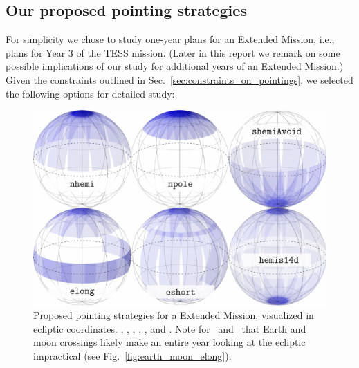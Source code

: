 \subsection{Our proposed pointing strategies}
\label{sec:proposed_pointings}

For simplicity we chose to study one-year plans for an Extended
Mission, i.e., plans for Year 3 of the TESS mission. (Later in this
report we remark on some possible implications of our study for
additional years of an Extended Mission.)  Given the constraints
outlined in Sec.~\ref{sec:constraints_on_pointings}, we selected the
following options for detailed study:

\begin{figure}[ht]
	\includegraphics{figures/proposed_pointings_texttt.pdf}
	\caption{Proposed pointing strategies for a \tess Extended Mission, visualized in ecliptic coordinates. \nhemi, \npole, \shemiAvoid, \elong, \eshort, and \hemis. Note for \elong\ and \eshort\ that Earth and moon crossings likely make an entire year looking at the ecliptic impractical (see Fig.~\protect\ref{fig:earth_moon_elong}).}
	\label{fig:proposed_pointings}
\end{figure}

